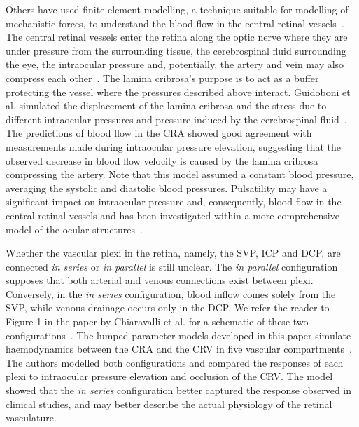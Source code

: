 \documentclass{article}
\begin{document}
Others have used finite element modelling, a technique suitable for modelling of mechanistic forces, to understand the blood flow in the central retinal vessels~\cite{Guidoboni_2014,Jin_2020}.
The central retinal vessels enter the retina along the optic nerve where they are under pressure from the surrounding tissue, the cerebrospinal fluid surrounding the eye, the intraocular pressure and, potentially, the artery and vein may also compress each other~\cite{Nickells_2012}.
The lamina cribrosa's purpose is to act as a buffer protecting the vessel where the pressures described above interact.
Guidoboni et al. simulated the displacement of the lamina cribrosa and the stress due to different intraocular pressures and pressure induced by the cerebrospinal fluid~\cite{Guidoboni_2014}.
The predictions of blood flow in the CRA showed good agreement with measurements made during intraocular pressure elevation, suggesting that the observed decrease in blood flow velocity is caused by the lamina cribrosa compressing the artery.
Note that this model assumed a constant blood pressure, averaging the systolic and diastolic blood pressures.
Pulsatility may have a significant impact on intraocular pressure and, consequently, blood flow in the central retinal vessels and has been investigated within a more comprehensive model of the ocular structures~\cite{Jin_2020}.


Whether the vascular plexi in the retina, namely, the SVP, ICP and DCP, are connected \textit{in series} or \textit{in parallel} is still unclear.
The \textit{in parallel} configuration supposes that both arterial and venous connections exist between plexi.
Conversely, in the \textit{in series} configuration, blood inflow comes solely from the SVP, while venous drainage occurs only in the DCP.
We refer the reader to Figure 1 in the paper by Chiaravalli et al. for a schematic of these two configurations~\cite{Chiaravalli_2021}.
The lumped parameter models developed in this paper simulate haemodynamics between the CRA and the CRV in five vascular compartments~\cite{Chiaravalli_2021}.
The authors modelled both configurations and compared the responses of each plexi to intraocular pressure elevation and occlusion of the CRV.
The model showed that the \textit{in series} configuration better captured the response observed in clinical studies, and may better describe the actual physiology of the retinal vasculature.
\end{document}
